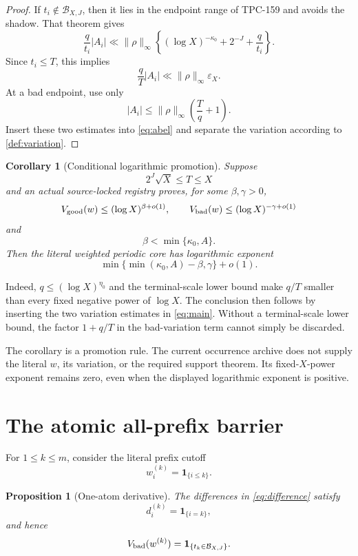 \documentclass[11pt]{article}
\newtheorem{proposition}[theorem]{Proposition}
\newtheorem{corollary}[theorem]{Corollary}
\theoremstyle{definition}
\newcommand{\Bbad}{\mathcal B}
\newcommand{\norm}[1]{\lVert#1\rVert}
\begin{document}
\begin{proof}
If \(t_i\notin\Bbad_{X,J}\), then it lies in the endpoint range of
TPC-159 and avoids the shadow.  That theorem gives
\[
 \frac q{t_i}|A_i|
 \ll\norm{\rho}_\infty
 \left\{(\log X)^{-\kappa_0}+2^{-J}+\frac q{t_i}\right\}.
\]
Since \(t_i\le T\), this implies
\[
 \frac qT|A_i|\ll\norm{\rho}_\infty\varepsilon_X.
\]
At a bad endpoint, use only
\[
 |A_i|\le\norm{\rho}_\infty\left(\frac Tq+1\right).
\]
Insert these two estimates into \eqref{eq:abel} and separate the
variation according to \cref{def:variation}.
\end{proof}

\begin{corollary}[Conditional logarithmic promotion]\label{cor:promotion}
Suppose
\[
 2^J\sqrt X\le T\le X
\]
and an actual source-locked registry proves, for some
\(\beta,\gamma>0\),
\[
 V_{\rm good}(w)\le(\log X)^{\beta+o(1)},\qquad
 V_{\rm bad}(w)\le(\log X)^{-\gamma+o(1)}
\]
and
\[
 \beta<\min\{\kappa_0,A\}.
\]
Then the literal weighted periodic core has logarithmic exponent
\[
 \min\{\min(\kappa_0,A)-\beta,\gamma\}+o(1).
\]
\end{corollary}

Indeed, \(q\le(\log X)^{\eta_0}\) and the terminal-scale lower bound
make \(q/T\) smaller than every fixed negative power of \(\log X\).
The conclusion then follows by inserting the two variation estimates
in \eqref{eq:main}.  Without a terminal-scale lower bound, the factor
\(1+q/T\) in the bad-variation term cannot simply be discarded.

The corollary is a promotion rule.  The current occurrence archive
does not supply the literal \(w\), its variation, or the required
support theorem.  Its fixed-\(X\)-power exponent remains zero, even
when the displayed logarithmic exponent is positive.

\section{The atomic all-prefix barrier}

For \(1\le k\le m\), consider the literal prefix cutoff
\[
 w_i^{(k)}=\mathbf1_{\{i\le k\}}.
\]

\begin{proposition}[One-atom derivative]\label{prop:atom}
The differences in \eqref{eq:difference} satisfy
\[
 d_i^{(k)}=\mathbf1_{\{i=k\}},
\]
and hence
\begin{equation}
 V_{\rm bad}(w^{(k)})
 =\mathbf1_{\{t_k\in\Bbad_{X,J}\}}.
\label{eq:badatom}
\end{equation}
\end{proposition}
\end{document}
